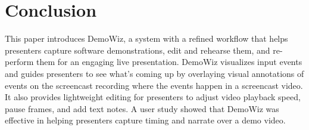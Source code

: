 \section{Conclusion}

This paper introduces DemoWiz, a system with a refined workflow that helps presenters capture software demonstrations, edit and rehearse them, and re-perform them for an engaging live presentation. DemoWiz visualizes input events and guides presenters to see what's coming up by overlaying visual annotations of events on the screencast recording where the events happen in a screencast video. It also provides lightweight editing for presenters to adjust video playback speed, pause frames, and add text notes. A user study showed that DemoWiz was effective in helping presenters capture timing and narrate over a demo video.


